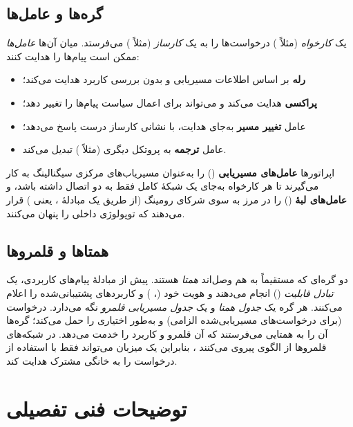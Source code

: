 \documentclass[11pt,a4paper]{article}
\begin{document}
\subsection{گره‌ها و عامل‌ها}
یک \emph{کارخواه}  (مثلاً ) درخواست‌ها را به یک \emph{کارساز} (مثلاً ) می‌فرستد. میان
آن‌ها \emph{عامل‌ها} ممکن است پیام‌ها را هدایت کنند:
\begin{itemize}
  \item \textbf{رله} بر اساس اطلاعات مسیریابی و بدون بررسی کاربرد هدایت می‌کند؛
  \item \textbf{پراکسی} هدایت می‌کند و می‌تواند برای اعمال سیاست پیام‌ها را تغییر دهد؛
  \item عامل \textbf{تغییر مسیر} به‌جای هدایت، با نشانی کارساز درست پاسخ می‌دهد؛
  \item عامل \textbf{ترجمه} به پروتکل دیگری (مثلاً ) تبدیل می‌کند.
\end{itemize}
اپراتورها \textbf{عامل‌های مسیریابی } () را به‌عنوان مسیریاب‌های مرکزی سیگنالینگ به کار می‌گیرند
تا هر کارخواه به‌جای یک شبکهٔ کامل فقط به دو  اتصال داشته باشد، و \textbf{عامل‌های لبهٔ }
() را در مرز به سوی شرکای رومینگ (از طریق یک مبادلهٔ ، یعنی ) قرار می‌دهند که توپولوژی
داخلی را پنهان می‌کنند.

\subsection{همتاها و قلمروها}
دو گره‌ای که مستقیماً به هم وصل‌اند \emph{همتا} هستند. پیش از مبادلهٔ پیام‌های کاربردی، یک \emph{تبادل قابلیت}
() انجام می‌دهند و هویت خود (، ) و کاربردهای پشتیبانی‌شده را اعلام
می‌کنند. هر گره یک \emph{جدول همتا} و یک \emph{جدول مسیریابی قلمرو} نگه می‌دارد. درخواست 
(برای درخواست‌های مسیریابی‌شده الزامی) و به‌طور اختیاری  را حمل می‌کند؛ گره‌ها آن را به همتایی
می‌فرستند که آن قلمرو و کاربرد را خدمت می‌دهد. در شبکه‌های  قلمروها از الگوی
 پیروی می‌کنند \cite{ts23003}، بنابراین یک  میزبان
می‌تواند فقط با استفاده از  درخواست  را به  خانگی مشترک هدایت کند.

\section{توضیحات فنی تفصیلی}
\end{document}
